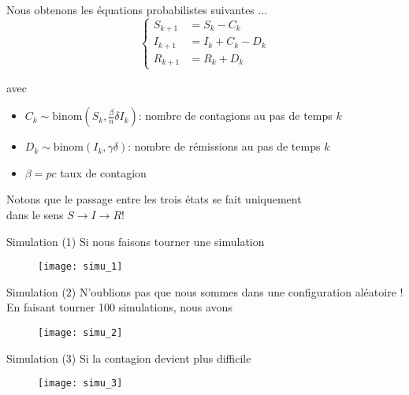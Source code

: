\documentclass[10pt]{beamer}
\begin{document}
\begin{frame}{Nous obtenons les équations probabilistes suivantes ...}
  \[
    \left\{
      \begin{aligned}
        S_{k+1} &= S_k - C_k \\
        I_{k+1} &= I_k + C_k - D_k \\
        R_{k+1} &= R_k + D_k
      \end{aligned}
    \right.
  \]

  \vspace{1cm}

  avec
  \begin{itemize}
    \item $C_k\sim \text{binom}(S_k, \frac{\beta}{n}\delta I_k)$: nombre de contagions au pas de temps $k$
    \item $D_k\sim \text{binom}(I_k, \gamma \delta)$: nombre de rémissions au pas de temps $k$
    \item $\beta = p c$ taux de contagion
  \end{itemize}

  \vspace{.5cm}
  \pause
  Notons que le passage entre les trois états se fait uniquement \\
  dans le sens $S \to I \to R$!
\end{frame}

\begin{frame}{Simulation (1)}
  Si nous faisons tourner une simulation
  \begin{figure}
    \texttt{[image: simu\_1]}
  \end{figure}
\end{frame}

\begin{frame}{Simulation (2)}
  N'oublions pas que nous sommes dans une configuration aléatoire ! \\
  En faisant tourner 100 simulations, nous avons
  \begin{figure}
    \texttt{[image: simu\_2]}
  \end{figure}
\end{frame}

\begin{frame}{Simulation (3)}
  Si la contagion devient plus difficile
  \begin{figure}
    \texttt{[image: simu\_3]}
  \end{figure}
\end{frame}
\end{document}
